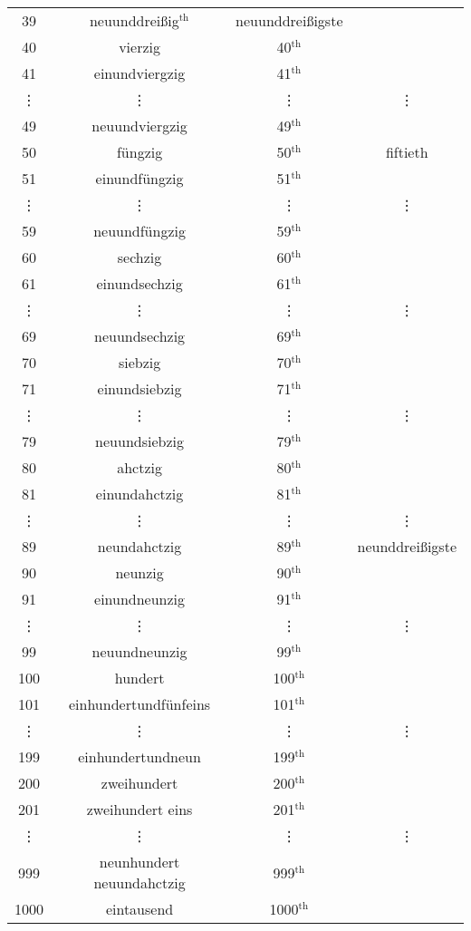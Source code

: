 \begin{tabular}{cccc}
	39&neuunddrei\ss ig$^{\text{th}}$&neuunddrei\ss igste\\
	40&vierzig&40$^{\text{th}}$&\\
	41&einundviergzig&41$^{\text{th}}$&\\
	\vdots&\vdots&\vdots&\vdots\\
	49&neuundviergzig&49$^{\text{th}}$&\\
	50&füngzig&50$^{\text{th}}$&fiftieth\\
	51&einundfüngzig&51$^{\text{th}}$&\\
	\vdots&\vdots&\vdots&\vdots\\
	59&neuundfüngzig&59$^{\text{th}}$&\\
	60&sechzig&60$^{\text{th}}$&\\
	61&einundsechzig&61$^{\text{th}}$&\\
	\vdots&\vdots&\vdots&\vdots\\
	69&neuundsechzig&69$^{\text{th}}$&\\
	70&siebzig&70$^{\text{th}}$&\\
	71&einundsiebzig&71$^{\text{th}}$&\\
	\vdots&\vdots&\vdots&\vdots\\
	79&neuundsiebzig&79$^{\text{th}}$&\\
	80&ahctzig&80$^{\text{th}}$&\\
	81&einundahctzig&81$^{\text{th}}$&\\
	\vdots&\vdots&\vdots&\vdots\\
	89&neundahctzig&89$^{\text{th}}$&neunddrei\ss igste\\
	90&neunzig&90$^{\text{th}}$&\\
	91&einundneunzig&91$^{\text{th}}$&\\
	\vdots&\vdots&\vdots&\vdots\\
	99&neuundneunzig&99$^{\text{th}}$&\\
	100&hundert&100$^{\text{th}}$&\\
	101&einhundertundfünfeins&101$^{\text{th}}$&\\
	\vdots&\vdots&\vdots&\vdots\\
	199&einhundertundneun&199$^{\text{th}}$&\\
	200&zweihundert&200$^{\text{th}}$&\\
	201&zweihundert eins&201$^{\text{th}}$&\\
	\vdots&\vdots&\vdots&\vdots\\
	999&neunhundert neuundahctzig&999$^{\text{th}}$&\\
	1000&eintausend&1000$^{\text{th}}$&\\

\end{tabular}
